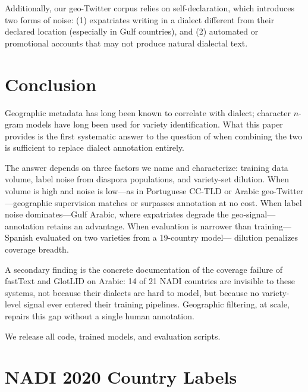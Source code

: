 \documentclass[11pt]{article}
\begin{document}
Additionally, our geo-Twitter corpus relies on self-declaration, which introduces
two forms of noise: (1) expatriates writing in a dialect different from their
declared location (especially in Gulf countries), and (2) automated or
promotional accounts that may not produce natural dialectal text.

\section{Conclusion}
\label{sec:conclusion}

Geographic metadata has long been known to correlate with dialect; character
$n$-gram models have long been used for variety identification.  What this
paper provides is the first systematic answer to the question of when combining
the two is sufficient to replace dialect annotation entirely.

The answer depends on three factors we name and characterize: training data
volume, label noise from diaspora populations, and variety-set dilution.
When volume is high and noise is low---as in Portuguese CC-TLD or Arabic
geo-Twitter---geographic supervision matches or surpasses annotation at no
cost.  When label noise dominates---Gulf Arabic, where expatriates degrade the
geo-signal---annotation retains an advantage.  When evaluation is narrower
than training---Spanish evaluated on two varieties from a 19-country model---
dilution penalizes coverage breadth.

A secondary finding is the concrete documentation of the coverage failure of
fastText and GlotLID on Arabic: 14 of 21 NADI countries are invisible to
these systems, not because their dialects are hard to model, but because no
variety-level signal ever entered their training pipelines.  Geographic
filtering, at scale, repairs this gap without a single human annotation.

We release all code, trained models, and evaluation scripts.



\appendix

\section{NADI 2020 Country Labels}
\label{app:labels}
\end{document}
